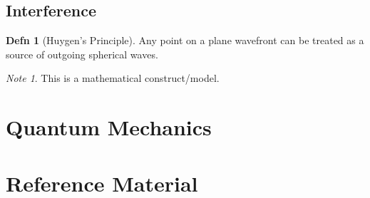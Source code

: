 \documentclass[10pt,letterpaper,final,twoside,notitlepage]{article}
\numberwithin{equation}{section} %
\theoremstyle{definition}
\newtheorem{definition}{Defn}
\theoremstyle{remark}
\newtheorem{note}{Note}
\begin{document}
	\subsection*{Interference} \label{subsec:Light Interference}
		\begin{definition}[Huygen's Principle] \label{def:Huygen's Principle}
			Any point on a plane wavefront can be treated as a source of outgoing spherical waves.
			\begin{note}
				This is a mathematical construct/model.
			\end{note}
		\end{definition}

\section{Quantum Mechanics} \label{sec:Quantum Mech}

\appendix
\section{Reference Material} \label{sec:Reference Material}



\end{document}
